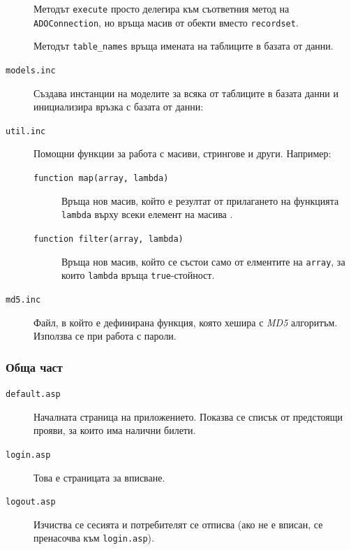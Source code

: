 \documentclass[a4paper,10pt, leqno]{article}
\renewcommand{\lstlistingname}{\bfseries Файл}
\newcommand{\term}[1] {\textsl{#1}}
\newcommand{\File}[1] {\texttt{#1}}
\begin{document}
\begin{description}
            Методът \texttt{execute} просто делегира към съответния метод на \texttt{ADOConnection}, но връща масив от обекти вместо
            \texttt{recordset}.

            Методът \texttt{table\_names} връща имената на таблиците в базата от данни.

        \item[\File{models.inc}]
            Създава инстанции на моделите за всяка от таблиците в базата данни и инициализира връзка с базата от данни:
            
            \renewcommand{\lstlistingname}{\bfseries Файл}
        \item[\File{util.inc}]
            Помощни функции за работа с масиви, стрингове и други. Например:
            \begin{description}
                \item[\texttt{function map(array, lambda)}]
                    Връща нов масив, който е резултат от прилагането на функцията \texttt{lambda} върху всеки елемент на масива .
                \item[\texttt{function filter(array, lambda)}]
                    Връща нов масив, който се състои само от елментите на \texttt{array}, за които \texttt{lambda} връща \texttt{true}-стойност.
            \end{description}
        \item[\File{md5.inc}]
            Файл, в който е дефинирана функция, която хешира с \term{MD5} алгоритъм. Използва се при работа с пароли.

    \end{description}


    \subsubsection{Обща част}
    \begin{description}
        \item[\File{default.asp}]
            Началната страница на приложението. Показва се списък от предстоящи прояви, за които има налични билети.
        \item[\File{login.asp}]
            Това е страницата за вписване.
        \item[\File{logout.asp}]
            Изчиства се сесията и потребителят се отписва (ако не е вписан, се пренасочва към \File{login.asp}).
    \end{description}
\end{document}
